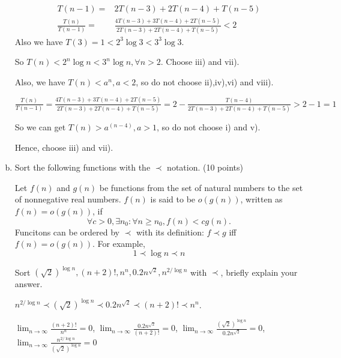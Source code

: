 \documentclass[11pt]{exam}
\begin{document}
\begin{enumerate}[(a)]
\begin{solution}
\begin{align*}
                  T(n-1) =              & 2T(n-3)+2T(n-4)+T(n-5)                                        \\
                  \frac{T(n)}{T(n-1)} = & \frac{ 4T(n-3)+3T(n-4)+2T(n-5)  }{2T(n-3)+2T(n-4)+T(n-5)} < 2
              \end{align*}
              Also we have $T(3) = 1 < 2^3 \log 3<3^3 \log 3$.

              So $T(n)<2^n \log n < 3^n \log n,\forall n>2$.
              Choose iii) and vii).

              Also, we have $T(n) < a^n,a<2$, so do not choose ii),iv),vi) and viii).

              $ \frac{T(n)}{T(n-1)} = \frac{ 4T(n-3)+3T(n-4)+2T(n-5)  }{2T(n-3)+2T(n-4)+T(n-5)} = 2- \frac{T(n-4)}{2T(n-3)+2T(n-4)+T(n-5)} > 2-1 =1$

              So we can get $T(n) > a^{(n-4)},a>1$, so do not choose i) and v).

              Hence, choose iii) and vii).

          \end{solution}

    \item Sort the following functions with the $\prec$ notation. (10 points)
          \begin{definition}
              Let $f(n)$ and $g(n)$ be functions from the set of natural numbers to the set of nonnegative real numbers.
              $f(n)$ is said to be $o(g(n))$, written as $f(n)=o(g(n))$, if
              $$\forall c>0,\exists n_{0}:\forall n\ge n_{0},f(n)<c g(n).$$
              Funcitons can be ordered by $\prec$ with its definition: $f\prec g$ iff $f(n)=o(g(n))$. For example,
              $$1 \prec \log n \prec n$$
          \end{definition}
          Sort $(\sqrt{2})^{\log n}, (n+2)!, n^n, 0.2n^{\sqrt{2}},  n^{2/\log n}$ with $\prec$, briefly explain your answer.
          \begin{solution}
              $ n^{2/\log n} \prec (\sqrt{2})^{\log n} \prec 0.2n^{\sqrt{2}} \prec (n+2)! \prec n^n$.


              $\lim_{n \to \infty}  \frac{(n+2)!}         {n^n} = 0$,
              $\lim_{n \to \infty}  \frac{0.2n^{\sqrt{2}}}{(n+2)!} =0   $,
              $\lim_{n \to \infty}  \frac{(\sqrt{2})^{\log n}}{0.2n^{\sqrt{2}}} =0$,
              $\lim_{n \to \infty}  \frac{n^{2/\log n}}{(\sqrt{2})^{\log n}} =0$
          \end{solution}
\end{enumerate}
\end{document}
